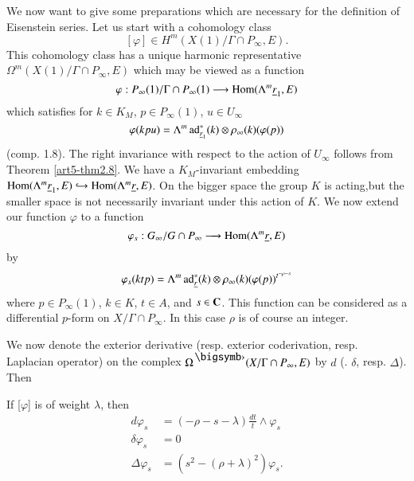 We now want to give some preparations which are necessary for the definition of Eisenstein series. Let us start with a cohomology class
$$
[\varphi] \in H^m (X(1)/ \Gamma \cap P_\infty, E).
$$
This cohomology class has a unique harmonic representative $\Omega^m (X(1) / \Gamma \cap P_\infty, E)$ which may be viewed as a function
$$
\varphi : P_\infty (1)/ \Gamma \cap P_\infty (1) \longrightarrow \operatorname{Hom} (\Lambda^m \underline{r}_1, E)
$$
which satisfies for $k \in K_M$, $p \in P_\infty (1)$, $u \in U_\infty$
$$
\varphi (k p u) = \Lambda^m \operatorname{ad}^\ast_{\underline{r}_1} (k) \otimes \rho_\infty (k) (\varphi (p))
$$
(comp. 1.8). The right invariance with respect to the action of $U_\infty$ follows from Theorem \eqref{art5-thm2.8}. We have a $K_M$-invariant embedding $\operatorname{Hom} (\Lambda^m \underline{r}_1, E) \hookrightarrow \operatorname{Hom} (\Lambda^m\underline{r}, E)$. On the bigger space the group $K$ is acting,\pageoriginale but the smaller space is not necessarily invariant under this action of $K$. We now extend our function $\varphi$ to a function
$$
\varphi_s : G_\infty / G \cap P_\infty \longrightarrow \operatorname{Hom} (\Lambda^m\underline{r}, E)
$$
by
$$
\varphi_s (ktp) = \Lambda^m \operatorname{ad}^\ast_{\underline{r}} (k) \otimes \rho_\infty  (k) (\varphi (p))^{t^{-\rho -s}}
$$
where $p \in P_{\infty} (1)$, $k \in K$, $t \in A$, and $s \in \mathbf{C}$. This function can be considered as a differential $p$-form on $X/ \Gamma  \cap P_\infty$. In this case $\rho$ is of course an integer.

We now denote the exterior derivative (resp. exterior coderivation, resp. Laplacian operator) on the complex $\Omega^\bigdot (X/ \Gamma \cap P_\infty, E)$ by $d$ (\resp. $\delta$, resp. $\Delta$). Then 

\setcounter{lemma}{0}
\begin{lemma}\label{art5-lem3.1}
If [$\varphi$] is of weight $\lambda$, then 
\begin{align*}
d \varphi_s & = (- \rho - s - \lambda) \frac{dt}{t} \wedge \varphi_s \\
\delta \varphi_s & = 0 \\
\Delta \varphi_s & = (s^2 - (\rho + \lambda)^2)\varphi_s.
\end{align*}
\end{lemma}

